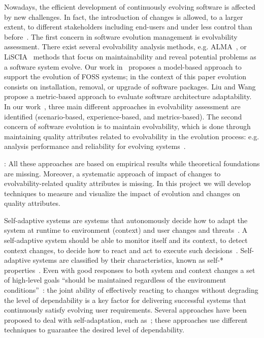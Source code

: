 \documentclass[12pt]{article}
\begin{document}
Nowadays, the efficient development of continuously evolving software is affected by new challenges.
In fact, the introduction of changes is allowed, to a larger extent, to different stakeholders including end-users and under less control than before~\cite{Mens2005,Baresi06}. The first concern in software evolution management is evolvability assessment. There exist several evolvability analysis methods, e.g. ALMA~\cite{Bengtsson2004}, or LiSCIA~\cite{BD10} methods that focus on maintainability and reveal potential problems as a software system evolve. Our work in~\cite{DiCosmo2011,DiRuscio2014,DiRuscio2015} proposes a model-based approach to support the evolution of FOSS systems; in the context of this paper evolution consists on installation, removal, or upgrade of software packages. %
Liu and Wang~\cite{LW05} propose a metric-based approach to evaluate software architecture adaptability. In our work~\cite{PCM12}, three main different approaches in evolvability assessment are identified (scenario-based, experience-based, and metrics-based). 
The second concern of software evolution is to maintain evolvability, which is done through maintaining quality attributes related to evolvability in the evolution process:  e.g. analysis performance and reliability for evolving systems~\cite{Koziolek2012}. 

: All these approaches are based on empirical results while theoretical foundations are missing. Moreover, a systematic approach of impact of changes to evolvability-related quality attributes is  missing. In this project we will develop techniques to measure and visualize the impact of evolution and changes on quality attributes. 

Self-adaptive systems are systems that autonomously decide how to adapt the system at runtime to environment (context) and user changes and threats~\cite{BSG09,DG13}. A self-adaptive system should be able to monitor itself and its context, to detect context changes, to decide how to react and act to execute such decisions~\cite{ST09}. Self-adaptive systems are classified by their characteristics, known as self-* properties~\cite{KC03,BJM05}. Even with good responses to both system and context changes a set of high-level goals ``should be maintained regardless of the environment conditions''~\cite{CG08}: the joint ability of effectively reacting to changes without degrading the level of dependability is a key factor for delivering successful systems that continuously satisfy evolving user requirements. Several approaches have been proposed to deal with self-adaptation, such as~\cite{terBeek2015,BE10,BA12,Bucchiarone2015}; these approaches use different techniques to guarantee the desired level of dependability.
\end{document}
